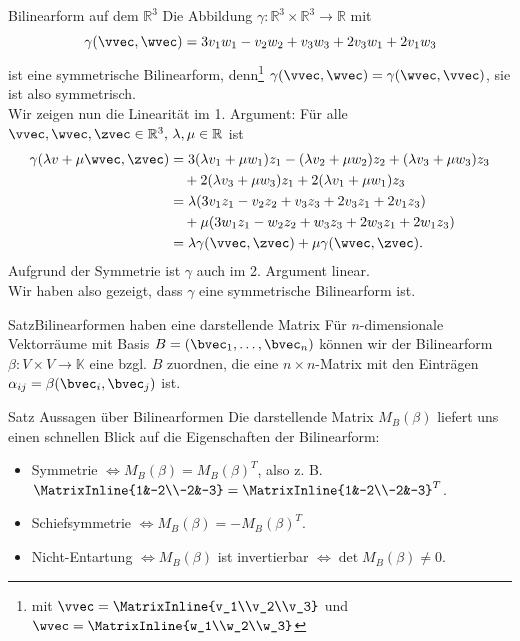 \begin{Beispiel}
{Bilinearform auf dem $\mathbb{R}^3$}\label{03:beispBiFo}
Die Abbildung $\gamma:\mathbb{R}^3\times \mathbb{R}^3\to \mathbb{R}$ mit
\begin{equation*}
    \gamma(\vvec,\wvec)=3v_1w_1-v_2w_2+v_3w_3+2v_3w_1+2v_1w_3
\end{equation*}
ist eine symmetrische Bilinearform, denn\footnote{mit $\vvec=\MatrixInline{v_1\\v_2\\v_3}$ und $\wvec=\MatrixInline{w_1\\w_2\\w_3}$} $\gamma(\vvec,\wvec)=\gamma(\wvec,\vvec)$, sie ist also symmetrisch.\\
Wir zeigen nun die Linearität im 1. Argument: Für alle $\vvec,\wvec,\zvec\in\mathbb{R}^3,\,\lambda,\mu\in\mathbb{R}$ ist
\begin{align*}
    \gamma(\lambda v+\mu \wvec,\zvec)&=3(\lambda v_1+\mu w_1)z_1-(\lambda v_2+\mu w_2)z_2+(\lambda v_3+\mu w_3)z_3\\
    &\quad +2(\lambda v_3+\mu w_3)z_1+2(\lambda v_1+\mu w_1)z_3\\
    &=\lambda(3v_1z_1-v_2z_2+v_3z_3+2v_3z_1+2v_1z_3)\\
    &\quad+\mu(3w_1z_1-w_2z_2+w_3z_3+2w_3z_1+2w_1z_3)\\
    &=\lambda\gamma(\vvec,\zvec)+\mu\gamma(\wvec,\zvec).
\end{align*}
Aufgrund der Symmetrie ist $\gamma$ auch im 2. Argument linear.\\
Wir haben also gezeigt, dass $\gamma$ eine symmetrische Bilinearform ist.
\end{Beispiel}
\begin{Satz}
{Satz}{Bilinearformen haben eine darstellende Matrix}
Für $n$-dimensionale Vektorräume mit Basis $B=(\bvec_1,\ldots,\bvec_n)$ können wir der Bilinearform $\beta:V\times V\to \mathbb{K}$ eine  bzgl. $B$ zuordnen, die eine $n\times n$-Matrix mit den Einträgen \underline{$\alpha_{ij}=\beta(\bvec_i,\bvec_j)$} ist.\\
\end{Satz}
\begin{Satz}{Satz}
{Aussagen über Bilinearformen}
Die darstellende Matrix $M_B(\beta)$ liefert uns einen schnellen Blick auf die Eigenschaften der Bilinearform:
\begin{itemize}
    \item Symmetrie $\iff M_B(\beta)=M_B(\beta)^T$, also z. B. $\MatrixInline{1&-2\\-2&-3}=\MatrixInline{1&-2\\-2&-3}^T$.
    \item Schiefsymmetrie $\iff M_B(\beta)=-M_B(\beta)^T$.
    \item Nicht-Entartung $\iff M_B(\beta)$ ist invertierbar $\iff\det M_B(\beta)\neq 0$.
\end{itemize}
\end{Satz}

